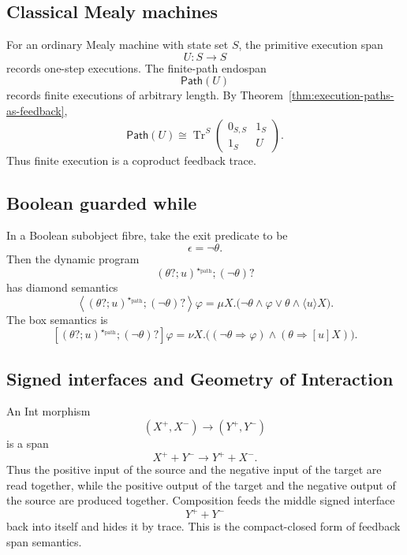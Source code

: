 \subsection{Classical Mealy machines}
\label{subsec:feedback-classical-mealy}

For an ordinary Mealy machine with state set \(S\), the primitive execution
span
\[
  U:S\to S
\]
records one-step executions. The finite-path endospan
\[
  \mathsf{Path}(U)
\]
records finite executions of arbitrary length. By
Theorem~\ref{thm:execution-paths-as-feedback},
\[
  \mathsf{Path}(U)
  \cong
  \operatorname{Tr}^{S}
  \begin{pmatrix}
    0_{S,S} & 1_S\\
    1_S & U
  \end{pmatrix}.
\]
Thus finite execution is a coproduct feedback trace.

\subsection{Boolean guarded while}
\label{subsec:boolean-guarded-while}

In a Boolean subobject fibre, take the exit predicate to be
\[
  \epsilon=\neg\theta.
\]
Then the dynamic program
\[
  (\theta?;u)^{\star_{\mathrm{path}}};(\neg\theta)?
\]
has diamond semantics
\[
  \left\langle
    (\theta?;u)^{\star_{\mathrm{path}}};(\neg\theta)?
  \right\rangle\varphi
  =
  \mu X.
  \bigl(
    \neg\theta\wedge\varphi
    \vee
    \theta\wedge\langle u\rangle X
  \bigr).
\]
The box semantics is
\[
  \left[
    (\theta?;u)^{\star_{\mathrm{path}}};(\neg\theta)?
  \right]\varphi
  =
  \nu X.
  \bigl(
    (\neg\theta\Rightarrow\varphi)
    \wedge
    (\theta\Rightarrow[u]X)
  \bigr).
\]

\subsection{Signed interfaces and Geometry of Interaction}
\label{subsec:signed-interfaces-feedback}

An Int morphism
\[
  (X^+,X^-)\longrightarrow(Y^+,Y^-)
\]
is a span
\[
  X^+ + Y^-
  \longrightarrow
  Y^+ + X^-.
\]
Thus the positive input of the source and the negative input of the target are
read together, while the positive output of the target and the negative output
of the source are produced together. Composition feeds the middle signed
interface
\[
  Y^+ + Y^-
\]
back into itself and hides it by trace. This is the compact-closed form of
feedback span semantics.

